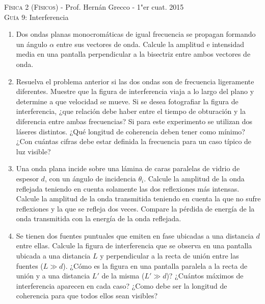 \documentclass[11pt,spanish,a4paper]{article}
\begin{document}
\begin{center}
    \textsc{\large Física 2 (Físicos)} - Prof. Hernán Grecco - 1"er cuat. 2015\\
	\textsc{\large Guía 9:}	Interferencia
\end{center}



\begin{enumerate}
	\item Dos ondas planas monocromáticas de igual frecuencia se propagan formando un ángulo \( \alpha \) entre sus vectores de onda.
	Calcule la amplitud e intensidad media en una pantalla perpendicular a la bisectriz entre ambos vectores de onda.


\item Resuelva el problema anterior si las dos ondas son de frecuencia ligeramente diferentes.
	Muestre que la figura de interferencia viaja a lo largo del plano y determine a que	velocidad se mueve.
	Si se desea fotografiar la figura de interferencia, ¿que relación debe haber entre el tiempo de obturación y la diferencia entre ambas frecuencias?
	Si para este experimento se utilizan dos láseres distintos.
	¿Qué longitud de coherencia deben tener como mínimo?
	¿Con cuántas cifras debe estar definida la frecuencia para un caso típico de luz visible?

	
\item Una onda plana incide sobre una lámina de caras paralelas de vidrio de espesor \(d \), con un ángulo de incidencia \(\theta_i \).
	Calcule la amplitud de la onda reflejada teniendo en cuenta solamente las dos reflexiones más intensas.
	Calcule la amplitud de la onda transmitida teniendo en cuenta la que no sufre reflexiones y la que se refleja dos veces.
	Compare la pérdida de energía de la onda transmitida con la energía de la onda reflejada.


\item Se tienen dos fuentes puntuales que emiten en fase ubicadas a una distancia \(d \) entre ellas.
	Calcule la figura de interferencia que se observa en una pantalla ubicada a una distancia \(L \) y perpendicular a la recta de unión entre las fuentes (\(L \gg d \)).
	¿Cómo es la figura en una pantalla paralela a la recta de unión y a una distancia \(L' \) de la misma (\( L' \gg d \))?
	¿Cuántos máximos de interferencia aparecen en cada caso?
	¿Como debe ser la longitud de coherencia para que todos ellos sean visibles?


\end{enumerate}
\end{document}
